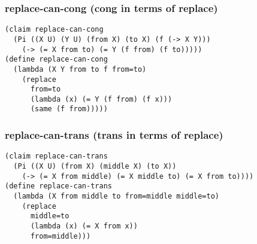 \subsubsection{replace-can-cong (cong in terms of replace)} \label{code:replace-can-cong}
\begin{verbatim}
(claim replace-can-cong
  (Pi ((X U) (Y U) (from X) (to X) (f (-> X Y)))
    (-> (= X from to) (= Y (f from) (f to)))))
(define replace-can-cong
  (lambda (X Y from to f from=to)
    (replace
      from=to
      (lambda (x) (= Y (f from) (f x)))
      (same (f from)))))
\end{verbatim}

\subsubsection{replace-can-trans (trans in terms of replace)} \label{code:replace-can-trans}
\begin{verbatim}
(claim replace-can-trans
  (Pi ((X U) (from X) (middle X) (to X))
    (-> (= X from middle) (= X middle to) (= X from to))))
(define replace-can-trans
  (lambda (X from middle to from=middle middle=to)
    (replace
      middle=to
      (lambda (x) (= X from x))
      from=middle)))
\end{verbatim}


